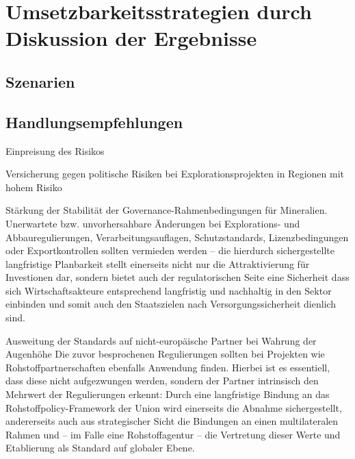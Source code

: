 \documentclass[12pt,a4paper,oneside]{book} %
\begin{document}
	
\chapter{Umsetzbarkeitsstrategien durch Diskussion der Ergebnisse}	

\section{Szenarien}

\section{Handlungsempfehlungen}

Einpreisung des Risikos


Versicherung gegen politische Risiken bei Explorationsprojekten in Regionen mit hohem Risiko

Stärkung der Stabilität der Governance-Rahmenbedingungen für Mineralien.
Unerwartete bzw. unvorhersahbare Änderungen bei Explorations- und Abbauregulierungen, Verarbeitungsauflagen, Schutzstandards, Lizenzbedingungen oder Exportkontrollen sollten vermieden werden -- die hierdurch sichergestellte langfristige Planbarkeit stellt einerseits nicht nur die Attraktivierung für Investionen dar, sondern bietet auch der regulatorischen Seite eine Sicherheit dass sich Wirtschaftsakteure entsprechend langfristig und nachhaltig in den Sektor einbinden und somit auch den Staatszielen nach Versorgungssicherheit dienlich sind.

Ausweitung der Standards auf nicht-europäische Partner bei Wahrung der Augenhöhe
Die zuvor besprochenen Regulierungen sollten bei Projekten wie Rohstoffpartnerschaften ebenfalls Anwendung finden. Hierbei ist es essentiell, dass diese nicht aufgezwungen werden, sondern der Partner intrinsisch den Mehrwert der Regulierungen erkennt: Durch eine langfristige Bindung an das Rohstoffpolicy-Framework der Union wird einerseits die Abnahme sichergestellt, andererseits auch aus strategischer Sicht die Bindungen an einen multilateralen Rahmen und -- im Falle eine Rohstoffagentur --  die Vertretung dieser Werte und Etablierung als Standard auf globaler Ebene. 
	
\end{document}
